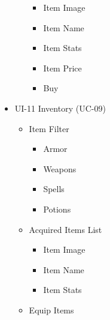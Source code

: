 \documentclass[12pt]{report}
\renewcommand{\_}{\kern-1.5pt\textunderscore\kern-1.5pt}
\begin{document}
\begin{itemize}
\begin{itemize}
\begin{itemize}
	\item Item Image\par

	\item Item Name\par

	\item Item Stats\par

	\item Item Price\par

	\item Buy \par


\end{itemize}
\end{itemize}
\newpage
	\item UI-11 Inventory (UC-09)\par

\begin{itemize}
	\item Item Filter\par

\begin{itemize}
	\item Armor\par

	\item Weapons\par

	\item Spells\par

	\item Potions\par


\end{itemize}
	\item Acquired Items List\par

\begin{itemize}
	\item Item Image\par

	\item Item Name\par

	\item Item Stats\par


\end{itemize}
	\item Equip Items\par


\end{itemize}
\end{itemize}
\end{document}
